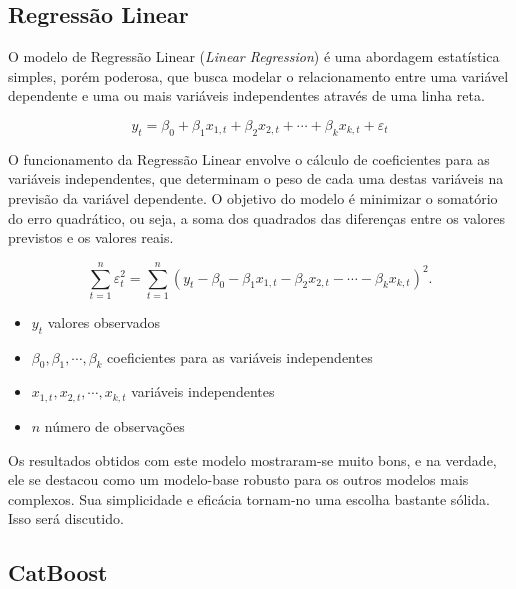 \subsection{Regressão Linear}

O modelo de Regressão Linear (\textit{Linear Regression}) é uma abordagem estatística simples, porém poderosa, que busca modelar o relacionamento entre uma variável dependente e uma ou mais variáveis independentes através de uma linha reta.

\begin{equation}
	y_{t} = \beta_{0} + \beta_{1} x_{1,t} + \beta_{2} x_{2,t} + \cdots +
	\beta_{k} x_{k,t} + \varepsilon_{t}
\end{equation}

O funcionamento da Regressão Linear envolve o cálculo de coeficientes para as variáveis independentes, que determinam o peso de cada uma destas variáveis na previsão da variável dependente. O objetivo do modelo é minimizar o somatório do erro quadrático, ou seja, a soma dos quadrados das diferenças entre os valores previstos e os valores reais.\cite{hyndman_fpp3_2024c}

\begin{equation}
	\sum_{t=1}^n \varepsilon_t^2 = \sum_{t=1}^n (y_t -
	\beta_{0} - \beta_{1} x_{1,t} - \beta_{2} x_{2,t} - \cdots - \beta_{k} x_{k,t})^2.
\end{equation}
\begin{itemize}
	\item $y_t$ valores observados
	\item $\beta_{0} , \beta_{1} , \cdots , \beta_{k}$ coeficientes para as variáveis independentes
	\item $x_{1,t} , x_{2,t} , \cdots , x_{k,t}$ variáveis independentes
	\item $n$ número de observações
\end{itemize}

Os resultados obtidos com este modelo mostraram-se muito bons, e na verdade, ele se destacou como um modelo-base robusto para os outros modelos mais complexos. Sua simplicidade e eficácia tornam-no uma escolha bastante sólida. Isso será discutido.

\subsection{CatBoost}

